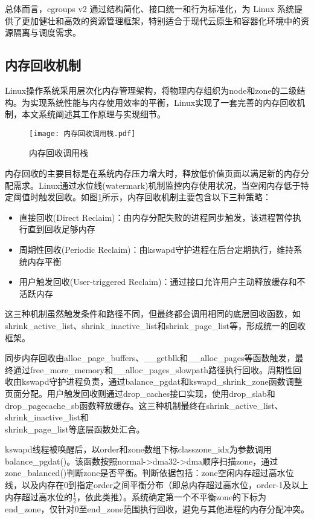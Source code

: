 总体而言，cgroups v2 通过结构简化、接口统一和行为标准化，为 Linux 系统提供了更加健壮和高效的资源管理框架，特别适合于现代云原生和容器化环境中的资源隔离与调度需求。

\subsection{内存回收机制}
\label{sec:Linux内存回收机制}

Linux操作系统采用层次化内存管理架构，将物理内存组织为node和zone的二级结构。为实现系统性能与内存使用效率的平衡，Linux实现了一套完善的内存回收机制，本文系统阐述其工作原理与实现细节。

\begin{figure}[h]
    \centering
    \texttt{[image: 内存回收调用栈.pdf]}
    \caption{内存回收调用栈}
    \label{fig:memory_reclaim_callgraph}
\end{figure}

内存回收的主要目标是在系统内存压力增大时，释放低价值页面以满足新的内存分配需求。Linux通过水位线(watermark)机制监控内存使用状况，当空闲内存低于特定阈值时触发回收。如图\ref{fig:memory_reclaim_callgraph}所示，内存回收机制主要包含以下三种策略：

\begin{itemize}
    \item 直接回收(Direct Reclaim)：由内存分配失败的进程同步触发，该进程暂停执行直到回收足够内存
    \item 周期性回收(Periodic Reclaim)：由kswapd守护进程在后台定期执行，维持系统内存平衡
    \item 用户触发回收(User-triggered Reclaim)：通过接口允许用户主动释放缓存和不活跃内存
\end{itemize}

这三种机制虽然触发条件和路径不同，但最终都会调用相同的底层回收函数，如shrink\_active\_list、shrink\_inactive\_list和shrink\_page\_list等，形成统一的回收框架。

同步内存回收由alloc\_page\_buffers、\_\_getblk和\_\_alloc\_pages等函数触发，最终通过free\_more\_memory和\_\_alloc\_pages\_slowpath路径执行回收。周期性回收由kswapd守护进程负责，通过balance\_pgdat和kswapd\_shrink\_zone函数调整页面分配。用户触发回收则通过drop\_caches接口实现，使用drop\_slab和drop\_pagecache\_sb函数释放缓存。这三种机制最终在shrink\_active\_list、shrink\_inactive\_list和\\shrink\_page\_list等底层函数处汇合。

kswapd线程被唤醒后，以order和zone数组下标classzone\_idx为参数调用balance\_pgdat()。该函数按照normal->dma32->dma顺序扫描zone，通过zone\_balanced()判断zone是否平衡。判断依据包括：zone空闲内存超过高水位线，以及内存在0到指定order之间平衡分布（即总内存超过高水位，order-1及以上内存超过高水位的\(\frac{1}{2}\)，依此类推）。系统确定第一个不平衡zone的下标为end\_zone，仅针对0至end\_zone范围执行回收，避免与其他进程的内存分配冲突。

